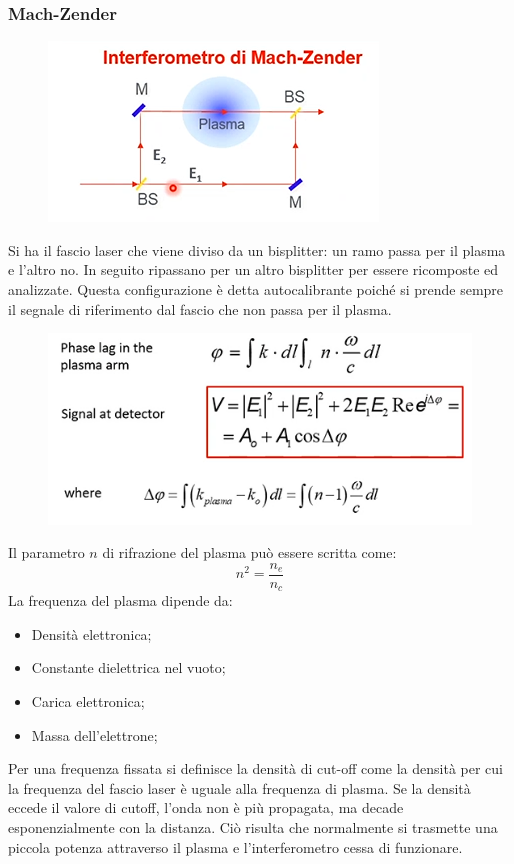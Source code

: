 \documentclass{article}
\begin{document}
\subsubsection{Mach-Zender}
\begin{figure}
	\includegraphics[scale=0.4]{2022-05-29-16-10-11.png}%
\end{figure}
Si ha il fascio laser che viene diviso da un bisplitter: un ramo passa per il plasma e l'altro no. In seguito ripassano per un altro bisplitter per essere ricomposte ed analizzate. Questa configurazione è detta autocalibrante poiché si prende sempre il segnale di riferimento dal fascio che non passa per il plasma.
\begin{figure}
	\includegraphics[scale=0.4]{2022-05-29-16-13-05.png}%
\end{figure}
Il parametro \(n\) di rifrazione del plasma può essere scritta come:\begin{equation}
	n^{2}=\frac{n_{e}}{n_{c}}
\end{equation}
La frequenza del plasma dipende da:\begin{itemize}
	\item Densità elettronica;
	\item Constante dielettrica nel vuoto;
	\item Carica elettronica;
	\item Massa dell'elettrone;
\end{itemize}
Per una frequenza fissata si definisce la densità di cut-off come la densità per cui la frequenza del fascio laser è uguale alla frequenza di plasma. Se la densità eccede il valore di cutoff, l'onda non è più propagata, ma decade esponenzialmente con la distanza. Ciò risulta che normalmente si trasmette una piccola potenza attraverso il plasma e l'interferometro cessa di funzionare.
\end{document}
